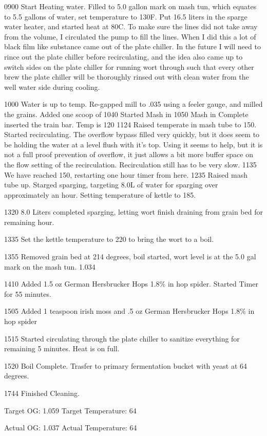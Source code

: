 0900 Start Heating water.  Filled to 5.0 gallon mark on mash tun, which equates to 5.5 gallons of water, set temperature to 130F.  Put 16.5 liters in the sparge water heater, and started heat at 80C.  To make sure the lines did not take away from the volume, I circulated the pump to fill the lines.  When I did this a lot of black film like substance came out of the plate chiller.  In the future I will need to rince out the plate chiller before recirculating, and the idea also came up to switch sides on the plate chiller for running wort through such that every other brew the plate chiller will be thoroughly rinsed out with clean water from the well water side during cooling.

1000 Water is up to temp.  Re-gapped mill to .035 using a feeler gauge, and milled the grains.  Added one scoop of 
1040 Started Mash in
1050 Mash in Complete inserted the train bar. Temp is 120
1124 Raised temperate in mash tube to 150.  Started recirculating. The overflow bypass filled very quickly, but it does seem to be holding the water at a level flush with it's top.  Using it seems to help, but it is not a full proof prevention of overflow, it just allows a bit more buffer space on the flow setting of the recirculation.  Recirculation still has to be very slow.
1135 We have reached 150, restarting one hour timer from here.
1235 Raised mash tube up. Starged sparging, targeting 8.0L of water for sparging over approximately an hour.  Setting temperature of kettle to 185.

1320 8.0 Liters completed sparging, letting wort finish draining from grain bed for remaining hour.

1335 Set the kettle temperature to 220 to bring the wort to a boil.

1355 Removed grain bed at 214 degrees, boil started, wort level is at the 5.0 gal mark on the mash tun. 1.034

1410 Added 1.5 oz German Hersbrucker Hops 1.8\% in hop spider.  Started Timer for 55 minutes.

1505 Added 1 teaspoon irish moss and .5 oz  German Hersbrucker Hops 1.8\% in hop spider

1515 Started circulating through the plate chiller to sanitize everything for remaining 5 minutes.  Heat is on full.

1520 Boil Complete.  Trasfer to primary fermentation bucket with yeast at 64 degrees.

1744 Finished Cleaning.

Target OG: 1.059
Target Temperature: 64

Actual OG: 1.037
Actual Temperature: 64

